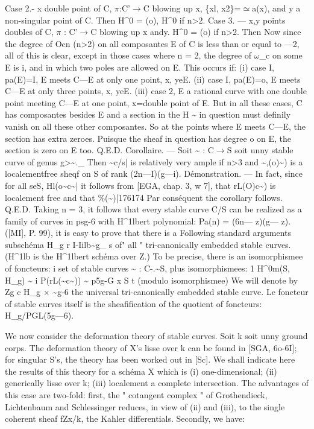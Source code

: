 \documentclass[11pt]{article}
\theoremstyle{plain}
\theoremstyle{definition}
\theoremstyle{remark}
\begin{document}
Case 2.- x double point of C, $\pi$:C'$\to$C blowing up x, \{xl, x2\}=$\simeq$a(x), and y a non-singular point of C. Then H\textasciicircum{}0 = (o), H\textasciicircum{}0 if n>2. Case 3. --- x,y points doubles of C, $\pi$ : C'$\to$C blowing up x andy. H\textasciicircum{}0 = (o) if n>2. Then Now since the degree of Ocn (n>2) on all composantes E of C is less than or equal to ---2, all of this is clear, except in those cases where n = 2, the degree of $\omega$\_c on some E is i, and in which two poles are allowed on E. This occurs if: (i) case I, pa(E)=I, E meets C---E at only one point, x, yeE. (ii) case I, pa(E)=o, E meets C---E at only three points, x, yeE. (iii) case 2, E a rational curve with one double point meeting C---E at one point, x=double point of E. But in all these cases, C has composantes besides E and a section in the H \textasciitilde{} in question must definily vanish on all these other composantes. So at the points where E meets C---E, the section has extra zeroes. Puisque the sheaf in question has degree o on E, the section is zero on E too. Q.E.D. Corollaire. --- Soit \textasciitilde{} : C$\to$S soit unny stable curve of genus g>\textasciitilde{}.\_ Then \textasciitilde{}c/s| is relatively very ample if n>3 and \textasciitilde{},(o)\textasciitilde{}) is a localementfree sheqf on S of rank (2n---I)(g---i). D\'emonstration. --- In fact, since for all seS, Hl(o\textasciitilde{}c\textasciitilde{}| it follows from [EGA, chap. 3, w 7], that rL(O)c\textasciitilde{}) is localement free and that \%(\textasciitilde{})|176174 Par cons\'equent the corollary follows. Q.E.D. Taking n = 3, it follows that every stable curve C/S can be realized as a family of curves in psg-6 with H\textasciicircum{}1lbert polynomial: Pa(n) = (6n--- z)(g--- z). ([MI], P. 99), it is easy to prove that there is a Following standard arguments subsch\'ema H\_g r I-Iilb\textasciitilde{}g\_ s of" all " tri-canonically embedded stable curves. (H\textasciicircum{}1lb is the H\textasciicircum{}1lbert sch\'ema over Z.) To be precise, there is an isomorphismee of foncteurs: i set of stable curves \textasciitilde{} : C-.\textasciitilde{}S, plus isomorphismees: 1 H\textasciicircum{}0m(S, H\_g) \textasciitilde{} i P(rL(\textasciitilde{}c\textasciitilde{})) \textasciitilde{} p5g-G x S t (modulo isomorphismee) We will denote by Zg c H\_g $\times$ \textasciitilde{}g-6 the universal tri-canonically embedded stable curve. Le foncteur of stable curves itself is the sheafification of the quotient of foncteurs: H\_g/PGL(5g---6).

We now consider the deformation theory of stable curves. Soit k soit unny ground corps. The deformation theory of X's lisse over k can be found in [SGA, 6o-6I]; for singular S's, the theory has been worked out in [Sc]. We shall indicate here the results of this theory for a sch\'ema X which is (i) one-dimensional; (ii) generically lisse over k; (iii) localement a complete intersection. The advantages of this case are two-fold: first, the " cotangent complex " of Grothendieck, Lichtenbaum and Schlessinger reduces, in view of (ii) and (iii), to the single coherent sheaf fZx/k, the Kahler differentials. Secondly, we have:
\end{document}
